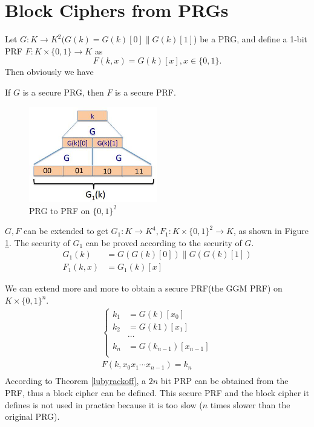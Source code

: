 \section{Block Ciphers from PRGs}
Let $G:K\rightarrow K^2(G(k)=G(k)[0]\parallel G(k)[1]$) be a PRG, and define a 1-bit PRF $F:K\times\{0,1\}\rightarrow K$ as 
\[F(k,x)=G(k)[x], x\in\{0,1\}.\]
Then obviously we have
\begin{theorem}
If $G$ is a secure PRG, then $F$ is a secure PRF.
\end{theorem}
\begin{figure}[ht]
\centering
\includegraphics[width=0.5\textwidth]{prg2prf_g1.jpg}
\caption{PRG to PRF on $\{0,1\}^2$}\label{prg2prf_g1}
\end{figure}
$G,F$ can be extended to get $G_1:K\rightarrow K^4, F_1:K\times\{0,1\}^2\rightarrow K$, as shown in Figure \ref{prg2prf_g1}. The security of $G_1$ can be proved according to the security of $G$.
\begin{align*}
G_1(k)&=G(G(k)[0])\parallel G(G(k)[1])\\
F_1(k, x)&=G_1(k)[x]
\end{align*}

We can extend more and more to obtain a secure PRF(the GGM PRF) on $K\times\{0,1\}^n$.
\begin{align*}
\begin{cases}
  k_1&=G(k)[x_0]\\
k_2&=G(k1)[x_1]\\
&\cdots\\
k_n&=G(k_{n-1})[x_{n-1}]\\
\end{cases}\\
F(k,x_0x_1\cdots x_{n-1})=k_n\\
\end{align*}
According to Theorem \ref{lubyrackoff}, a $2n$ bit PRP can be obtained from the PRF, thus a block cipher can be defined. This secure PRF and the block cipher it defines is not used in practice because it is too slow ($n$ times slower than the original PRG).
\ifx\PREAMBLE\undefined

\fi